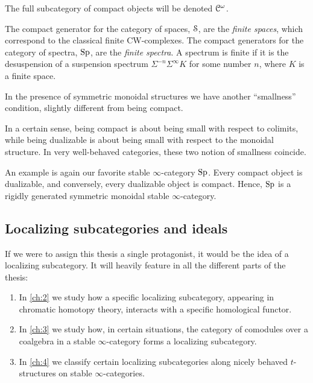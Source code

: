 \begin{definition}
    \label{ch1:def:compact-object}

\end{definition}

The full subcategory of compact objects will be denoted $\EuScript{C}^\omega$. 

\begin{definition}
    \label{ch1:def:compactly-generated-category}

\end{definition}

The compact generator for the category of spaces, $\EuScript{S}$, are the \emph{finite spaces}, which correspond to the classical finite CW-complexes. The compact generators for the category of spectra, $\mathrm{Sp}$, are the \emph{finite spectra}. A spectrum is finite if it is the desuspension of a suspension spectrum $\Sigma^{-n}\Sigma^\infty K$ for some number $n$, where $K$ is a finite space. 

In the presence of symmetric monoidal structures we have another ``smallness'' condition, slightly different from being compact. 

\begin{definition}
    \label{ch1:def:dualizable-object}
    
\end{definition}

In a certain sense, being compact is about being small with respect to colimits, while being dualizable is about being small with respect to the monoidal structure. In very well-behaved categories, these two notion of smallness coincide. 

\begin{definition}
    \label{ch1:rigidly-generated-category}
\end{definition}

An example is again our favorite stable $\infty$-category $\mathrm{Sp}$. Every compact object is dualizable, and conversely, every dualizable object is compact. Hence, $\mathrm{Sp}$ is a rigidly generated symmetric monoidal stable $\infty$-category. 


\subsection{Localizing subcategories and ideals}
\label{ch1:ssec:localizing-subcategories-and-ideals}

If we were to assign this thesis a single protagonist, it would be the idea of a localizing subcategory. It will heavily feature in all the different parts of the thesis: 
\begin{enumerate}
    \item In \cref{ch:2} we study how a specific localizing subcategory, appearing in chromatic homotopy theory, interacts with a specific homological functor.
    \item In \cref{ch:3} we study how, in certain situations, the category of comodules over a coalgebra in a stable $\infty$-category forms a localizing subcategory. 
    \item In \cref{ch:4} we classify certain localizing subcategories along nicely behaved $t$-structures on stable $\infty$-categories. 
\end{enumerate}

